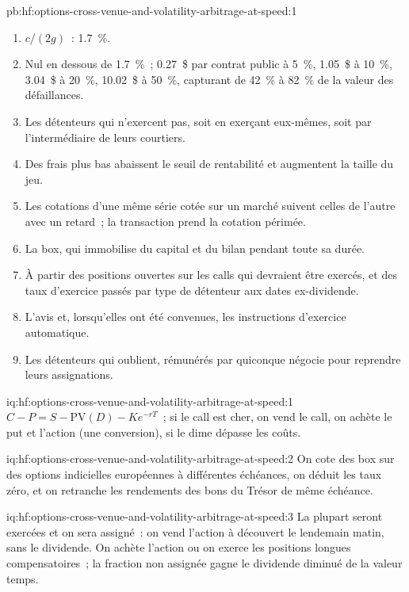 \begin{solution}{pb:hf:options-cross-venue-and-volatility-arbitrage-at-speed:1}
\begin{enumerate}
plafonds de frais des bourses.
\item $c/(2g)$~: 1.7~\%.
\item Nul en dessous de 1.7~\%~; 0.27~\$ par contrat public à 5~\%, 1.05~\$ à 10~\%, 3.04~\$ à 20~\%, 10.02~\$ à 50~\%, capturant de 42~\% à 82~\% de la
valeur des défaillances.
\item Les détenteurs qui n'exercent pas, soit en exerçant eux-mêmes, soit par l'intermédiaire de leurs courtiers.
\item Des frais plus bas abaissent le seuil de rentabilité et augmentent la taille du jeu.
\item Les cotations d'une même série cotée sur un marché suivent celles de l'autre avec un retard~; la transaction prend la cotation périmée.
\item La box, qui immobilise du capital et du bilan pendant toute sa durée.
\item À partir des positions ouvertes sur les calls qui devraient être exercés, et des taux d'exercice passés par type de détenteur aux dates ex-dividende.
\item L'avis et, lorsqu'elles ont été convenues, les instructions d'exercice automatique.
\item Les détenteurs qui oublient, rémunérés par quiconque négocie pour reprendre leurs assignations.
\end{enumerate}
\end{solution}

\begin{solution}{iq:hf:options-cross-venue-and-volatility-arbitrage-at-speed:1}
$C-P=S-\mathrm{PV}(D)-Ke^{-rT}$~; si le call est cher, on vend le call, on achète le put et l'action (une conversion), si le dime dépasse les coûts.
\end{solution}

\begin{solution}{iq:hf:options-cross-venue-and-volatility-arbitrage-at-speed:2}
On cote des box sur des options indicielles européennes à différentes échéances, on déduit les taux zéro, et on retranche les rendements des bons du Trésor de même échéance.
\end{solution}

\begin{solution}{iq:hf:options-cross-venue-and-volatility-arbitrage-at-speed:3}
La plupart seront exercées et on sera assigné~: on vend l'action à découvert le lendemain matin, sans le dividende. On achète l'action ou on exerce les positions longues compensatoires~;
la fraction non assignée gagne le dividende diminué de la valeur temps.
\end{solution}

